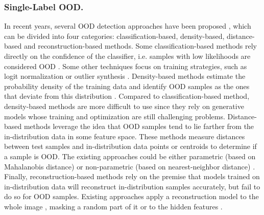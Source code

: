 \subsubsection{Single-Label OOD.}
In recent years, several OOD detection approaches have been proposed \cite{yang2024surveyOOD}, which can be divided into four categories: classification-based, density-based, distance-based and reconstruction-based methods. Some classification-based methods rely directly on the confidence of the classifier, i.e. samples with low likelihoods are considered OOD \cite{devries2018OOD, wang2021iccv}. Some other techniques focus on training strategies, such as logit normalization \cite{wei2022icml} or outlier synthesis \cite{du2022iclr,du2023neurips}. Density-based methods estimate the probability density of the training data and identify OOD samples as the ones that deviate from this distribution \cite{abati2019cvpr,xiao2020neurips,wang2022cvpr}. Compared to classification-based method, density-based methods are more difficult to use since they rely on generative models whose training and optimization are still challenging problems. Distance-based methods leverage the idea that OOD samples tend to lie farther from the in-distribution data in some feature space. These methods measure distances between test samples and in-distribution data points or centroids to determine if a sample is OOD. The existing approaches could be either parametric (based on Mahalanobis distance) \cite{lee2018neurips,ren2021arxiv} or non-parametric (based on nearest-neighbor distance) \cite{lee2018neurips,ren2021arxiv}. Finally, reconstruction-based methods rely on the premise that models trained on in-distribution data will reconstruct in-distribution samples accurately, but fail to do so for OOD samples. Existing approaches apply a reconstruction model to the whole image \cite{denouden2018arxiv}, masking a random part of it \cite{yang2022eccv,li2023cvpr} or to the hidden features \cite{zhoucvpr2022}.


